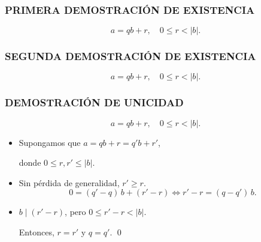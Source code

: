 \begin{frame}
  \frametitle{PRIMERA DEMOSTRACIÓN DE EXISTENCIA}

  \begin{framed}
      \[ a = qb + r,
        \quad
        0 \le r < |b|. \]
    \end{framed}


  \vspace{\fill}
\end{frame}

\begin{frame}
  \frametitle{SEGUNDA DEMOSTRACIÓN DE EXISTENCIA}

  \begin{framed}
    \[ a = qb + r,
      \quad
      0 \le r < |b|. \]
  \end{framed}




  \vspace{\fill}
\end{frame}

\begin{frame}
  \frametitle{DEMOSTRACIÓN DE UNICIDAD}

  \begin{framed}
    \[ a = qb + r,
      \quad
      0 \le r < |b|. \]
  \end{framed}

  \begin{itemize}
  \item<2-> Supongamos que
    $a = qb + r = q' b + r'$,

    donde $0 \le r, r' \le |b|$.

  \item<3-> Sin pérdida de generalidad, $r' \ge r$.
    $$0 = (q'-q)\,b + (r'-r) \iff r' - r = (q-q')\,b.$$

  \item<4-> $b \mid (r' - r)$, pero $0 \le r' - r < |b|$.

    Entonces, $r = r'$ y $q = q'$. \qed
  \end{itemize}

  \vspace{\fill}
\end{frame}


